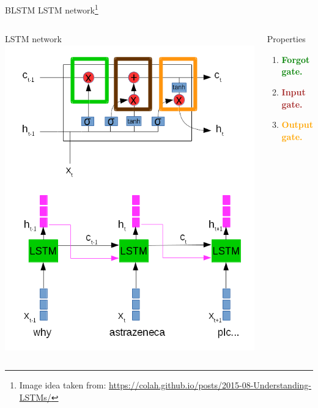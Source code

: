 \documentclass[10pt]{beamer}
\begin{document}
\begin{frame}[fragile]{BLSTM LSTM network\footnote{Image idea taken from: \url{https://colah.github.io/posts/2015-08-Understanding-LSTMs/}}}
\begin{columns}[T,onlytextwidth]
    \begin{block}{LSTM network}
\includegraphics[scale=0.3]{lstm_network.png}
\end{block}


      \begin{block}{Properties}
        \begin{enumerate}
        \item \textbf{\textcolor{green}{Forgot gate.}}
        \item \textbf{\textcolor{brown}{Input gate.}}
        \item \textbf{\textcolor{orange}{Output gate.}}
        \end{enumerate}
      \end{block}

  \end{columns}
\end{frame}
\end{document}
